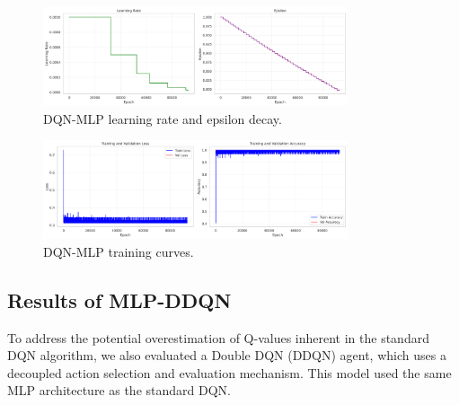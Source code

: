 \documentclass[12pt]{report}
\begin{document}
\vspace{0.5cm}

\begin{figure}[htbp]
    \centering
    \includegraphics[width=0.8\textwidth]{images/dqn_nn_lr_epsilon.png}
    \caption{DQN-MLP learning rate and epsilon decay.}
    \label{fig:dqn_nn_lr_epsilon}
\end{figure}

\vspace{0.5cm}

\begin{figure}[htbp]
    \centering
    \includegraphics[width=0.8\textwidth]{images/dqn_nn_training_curves.png}
    \caption{DQN-MLP training curves.}
    \label{fig:dqn_nn_training_curves}
\end{figure}


\subsection{Results of MLP-DDQN}
To address the potential overestimation of Q-values inherent in the standard DQN algorithm, we also evaluated a Double DQN (DDQN) agent, which uses a decoupled action selection and evaluation mechanism. This model used the same MLP architecture as the standard DQN.
\end{document}
